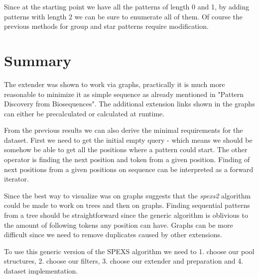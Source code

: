 \begin{figure}[H]
	
\end{figure}

Since at the starting point we have all the patterns of length 0 and 1, by adding patterns with length 2 we can be sure to enumerate all of them. Of course the previous methods for group and star patterns require modification.

\section{Summary}

The extender was shown to work via graphs, practically it is much more reasonable to minimize it as simple sequence as already mentioned in "Pattern Discovery from Biosequences"\cite{spexs}. The additional extension links shown in the graphs can either be precalculated or calculated at runtime.

From the previous results we can also derive the minimal requirements for the dataset. First we need to get the initial empty query - which means we should be somehow be able to get all the positions where a pattern could start. The other operator is finding the next position and token from a given position. Finding of next positions from a given positions on sequence can be interpreted as a forward iterator.

Since the best way to visualize was on graphs suggests that the \emph{spexs2} algorithm could be made to work on trees and then on graphs. Finding sequential patterns from a tree should be straightforward since the generic algorithm is oblivious to the amount of following tokens any position can have. Graphs can be more difficult since we need to remove duplicates caused by other extensions.

To use this generic version of the SPEXS algorithm we need to 1. choose our pool structures, 2. choose our filters, 3. choose our extender and preparation and 4. dataset implementation.
